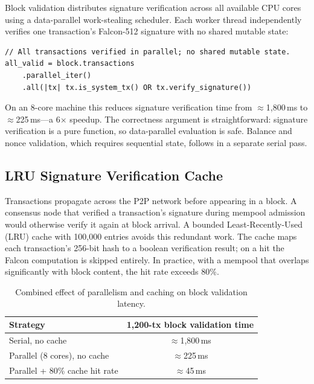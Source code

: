 \documentclass[11pt,a4paper]{article}
\begin{document}
Block validation distributes signature verification across all available CPU
cores using a data-parallel work-stealing scheduler. Each worker thread
independently verifies one transaction's Falcon-512 signature with no shared
mutable state:

\begin{lstlisting}[caption={Data-parallel block validation; correctness follows from pure-function semantics of Falcon verify.}]
// All transactions verified in parallel; no shared mutable state.
all_valid = block.transactions
    .parallel_iter()
    .all(|tx| tx.is_system_tx() OR tx.verify_signature())
\end{lstlisting}

On an 8-core machine this reduces signature verification time from
$\approx$1,800\,ms to $\approx$225\,ms---a 6$\times$ speedup. The correctness
argument is straightforward: signature verification is a pure function, so
data-parallel evaluation is safe. Balance and nonce validation, which requires
sequential state, follows in a separate serial pass.

\subsection{LRU Signature Verification Cache}

Transactions propagate across the P2P network before appearing in a block. A
consensus node that verified a transaction's signature during mempool admission
would otherwise verify it again at block arrival. A bounded Least-Recently-Used
(LRU) cache with 100,000 entries avoids this redundant work. The cache maps
each transaction's 256-bit hash to a boolean verification result; on a hit the
Falcon computation is skipped entirely. In practice, with a mempool that
overlaps significantly with block content, the hit rate exceeds 80\%.

\begin{table}[h]
\centering
\begin{tabular}{@{}lc@{}}
\toprule
\textbf{Strategy} & \textbf{1,200-tx block validation time} \\
\midrule
Serial, no cache                    & $\approx$1,800\,ms \\
Parallel (8 cores), no cache        & $\approx$225\,ms   \\
Parallel + 80\% cache hit rate      & $\approx$45\,ms    \\
\bottomrule
\end{tabular}
\caption{Combined effect of parallelism and caching on block validation latency.}
\end{table}
\end{document}
